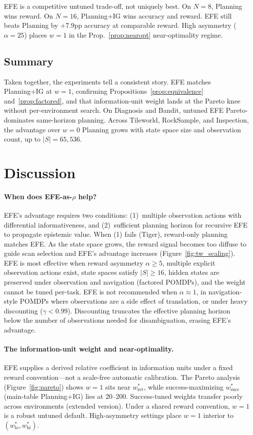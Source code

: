 \documentclass[runningheads]{llncs}
\begin{document}
EFE is a competitive untuned trade-off, not uniquely best. On $N{=}8$, Planning wins reward. On $N{=}16$, Planning+IG wins accuracy and reward. EFE still beats Planning by $+7.9$pp accuracy at comparable reward. High asymmetry ($\alpha = 25$) places $w{=}1$ in the Prop.~\ref{prop:nearopt} near-optimality regime.

\subsection{Summary}

Taken together, the experiments tell a consistent story. EFE matches Planning+IG at $w{=}1$, confirming Propositions~\ref{prop:equivalence} and~\ref{prop:factored}, and that information-unit weight lands at the Pareto knee without per-environment search. On Diagnosis and Bandit, untuned EFE Pareto-dominates same-horizon planning. Across Tileworld, RockSample, and Inspection, the advantage over $w{=}0$ Planning grows with state space size and observation count, up to $|S|{=}65{,}536$.

\section{Discussion}
\label{sec:discussion}

\paragraph{When does EFE-as-$\rho$ help?}
EFE's advantage requires two conditions: (1)~multiple observation actions with differential informativeness, and (2)~sufficient planning horizon for recursive EFE to propagate epistemic value. When (1) fails (Tiger), reward-only planning matches EFE. As the state space grows, the reward signal becomes too diffuse to guide scan selection and EFE's advantage increases (Figure~\ref{fig:tw_scaling}). EFE is most effective when reward asymmetry $\alpha \geq 5$, multiple explicit observation actions exist, state spaces satisfy $|S| \geq 16$, hidden states are preserved under observation and navigation (factored POMDPs), and the weight cannot be tuned per-task. EFE is not recommended when $\alpha \approx 1$, in navigation-style POMDPs where observations are a side effect of translation, or under heavy discounting ($\gamma < 0.99$). Discounting truncates the effective planning horizon below the number of observations needed for disambiguation, erasing EFE's advantage.

\paragraph{The information-unit weight and near-optimality.}
EFE supplies a derived relative coefficient in information units under a fixed reward convention---not a scale-free automatic calibration. The Pareto analysis (Figure~\ref{fig:pareto}) shows $w{=}1$ sits near $w^*_{\text{ret}}$, while success-maximizing $w^*_{\text{succ}}$ (main-table Planning+IG) lies at $20$--$200$. Success-tuned weights transfer poorly across environments (extended version). Under a shared reward convention, $w{=}1$ is a robust untuned default. High-asymmetry settings place $w{=}1$ interior to $(w^*_{\mathrm{lo}}, w^*_{\mathrm{hi}})$.
\end{document}
